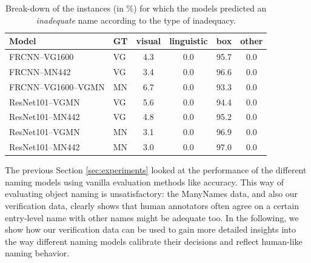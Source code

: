 \begin{table}[t]
	\centering
	\small
	\begin{tabular}{ll|c@{~}c@{~}c@{~}c}
		\toprule
		{Model} &  GT & visual &  linguistic &  box &  other \\
		\midrule
		FRCNN--VG1600 & VG &             4.3 &                 0.0 &                  95.7 &            0.0 \\
		FRCNN--MN442 & VG &             3.4 &                 0.0 &                  96.6 &            0.0 \\
		\midrule
		FRCNN--VG1600--VGMN & MN &             6.7 &                 0.0 &                  93.3 &            0.0 \\
		\midrule
		ResNet101--VGMN & VG &             5.6 &                 0.0 &                  94.4 &            0.0 \\
		ResNet101--MN442 & VG &             4.8 &                 0.0 &                  95.2 &            0.0 \\
		ResNet101--VGMN & MN &             3.1 &                 0.0 &                  96.9 &            0.0 \\
		ResNet101--MN442 & MN &             3.0 &                 0.0 &                  97.0 &            0.0 \\
		\bottomrule
	\end{tabular}
	\caption{Break-down of the instances (in \%) for which the models predicted an \textit{inadequate} name according to the type of inadequacy.  \label{tab:exp_inadequacy}}
\end{table}


The previous Section \ref{sec:experiments} looked at the performance of the different naming models using vanilla evaluation methods like accuracy.
This way of evaluating object naming is unsatisfactory: the ManyNames data, and also our verification data, clearly shows that human annotators often agree on a certain entry-level name with other names might be adequate too.
In the following, we show how our verification data can be used to gain more detailed insights into the way different naming models calibrate their decisions and reflect human-like naming behavior.



